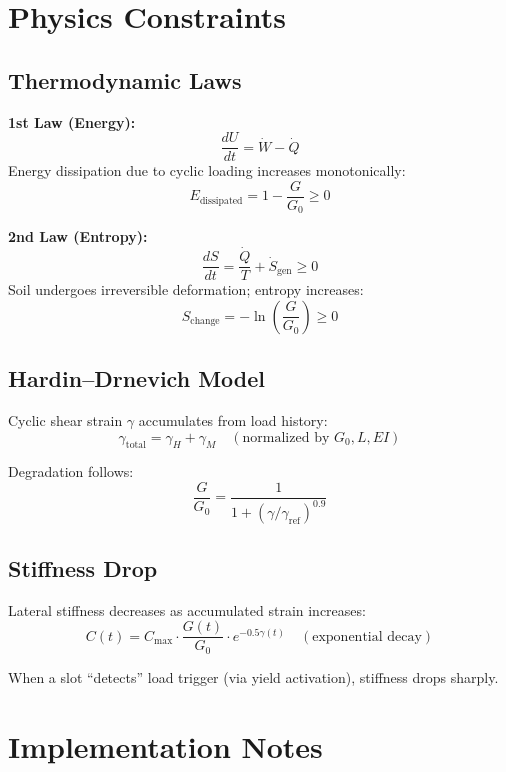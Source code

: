 \documentclass[12pt,a4paper]{article}
\begin{document}
\section{Physics Constraints}

\subsection{Thermodynamic Laws}

\textbf{1st Law (Energy):}
\[
  \frac{dU}{dt} = \dot{W} - \dot{Q}
\]
Energy dissipation due to cyclic loading increases monotonically:
\[
  E_{\text{dissipated}} = 1 - \frac{G}{G_0} \geq 0
\]

\textbf{2nd Law (Entropy):}
\[
  \frac{dS}{dt} = \frac{\dot{Q}}{T} + \dot{S}_{\text{gen}} \geq 0
\]
Soil undergoes irreversible deformation; entropy increases:
\[
  S_{\text{change}} = -\ln\left(\frac{G}{G_0}\right) \geq 0
\]

\subsection{Hardin--Drnevich Model}

Cyclic shear strain $\gamma$ accumulates from load history:
\[
  \gamma_{\text{total}} = \gamma_H + \gamma_M \quad (\text{normalized by }G_0, L, EI)
\]

Degradation follows:
\[
  \frac{G}{G_0} = \frac{1}{1 + (\gamma / \gamma_{\text{ref}})^{0.9}}
\]

\subsection{Stiffness Drop}

Lateral stiffness decreases as accumulated strain increases:
\[
  C(t) = C_{\max} \cdot \frac{G(t)}{G_0} \cdot e^{-0.5 \gamma(t)} \quad (\text{exponential decay})
\]

When a slot ``detects'' load trigger (via yield activation), stiffness drops sharply.

\section{Implementation Notes}
\end{document}
